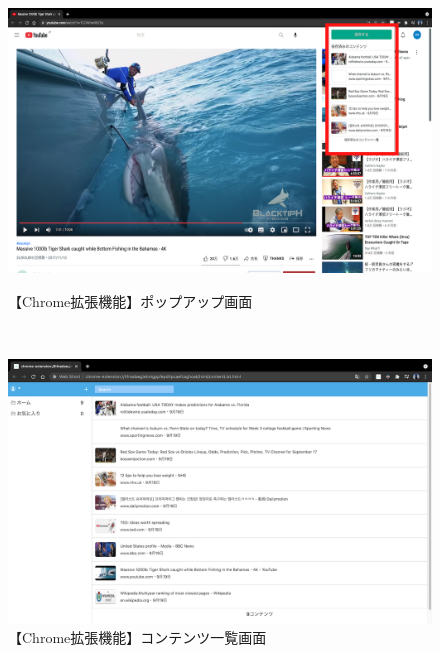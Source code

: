 \begin{figure}[htbp]
  \begin{minipage}[t]{\hsize}
    \label{fig:usage-chrome-popup}
    \begin{center}
      \includegraphics[bb=0 0 1280 800,width=15cm]{img/030_web_snapshot_system/chrome/usage-chrome-popup.pdf}
    \end{center}
    \caption{【Chrome拡張機能】ポップアップ画面}
  \end{minipage} \\

  \begin{minipage}[t]{\hsize}
    \label{fig:usage-chrome-list}
    \begin{center}
      \includegraphics[bb=0 0 640 400,width=15cm]{img/030_web_snapshot_system/chrome/usage-chrome-list.pdf}
    \end{center}
    \caption{【Chrome拡張機能】コンテンツ一覧画面}
  \end{minipage}
\end{figure}